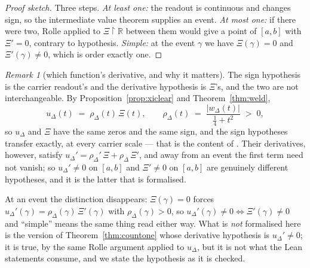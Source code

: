 \documentclass[11pt]{article}
\theoremstyle{plain}
\theoremstyle{definition}
\theoremstyle{remark}
\newtheorem{remark}[theorem]{Remark}
\newcommand{\R}{\mathbb{R}}
\newcommand{\lean}[1]{\texttt{\detokenize{#1}}}
\begin{document}
\begin{proof}[Proof sketch]
Three steps. \emph{At least one:} the readout is continuous and changes sign, so the
intermediate value theorem supplies an event. \emph{At most one:} if there were two,
Rolle applied to $\Xi\restriction\R$ between them would give a point of $[a,b]$ with
$\Xi'=0$, contrary to hypothesis. \emph{Simple:} at the event $\gamma$ we have
$\Xi(\gamma)=0$ and $\Xi'(\gamma)\ne0$, which is order exactly one.
\end{proof}

\begin{remark}[which function's derivative, and why it matters]\label{rem:whichderiv}
The sign hypothesis is the carrier readout's and the derivative hypothesis is
$\Xi$'s, and the two are not interchangeable. By
Proposition~\ref{prop:xiclear} and Theorem~\ref{thm:weld},
\[
  u_\Delta(t)\;=\;\rho_\Delta(t)\,\Xi(t),\qquad
  \rho_\Delta(t)\;=\;\frac{\lvert w_\Delta(t)\rvert}{\tfrac14+t^{2}}\;>\;0 ,
\]
so $u_\Delta$ and $\Xi$ have the same zeros and the same sign, and the sign
hypotheses transfer exactly, at every carrier scale --- that is the content of
\lean{sign_product_iff}. Their derivatives, however, satisfy
$u_\Delta'=\rho_\Delta'\,\Xi+\rho_\Delta\,\Xi'$, and away from an event the first
term need not vanish; so $u_\Delta'\ne0$ on $[a,b]$ and $\Xi'\ne0$ on $[a,b]$ are
genuinely different hypotheses, and it is the latter that is formalised.

At an event the distinction disappears: $\Xi(\gamma)=0$ forces
$u_\Delta'(\gamma)=\rho_\Delta(\gamma)\,\Xi'(\gamma)$ with $\rho_\Delta(\gamma)>0$, so
$u_\Delta'(\gamma)\ne0\iff\Xi'(\gamma)\ne0$ and ``simple'' means the same thing read
either way. What is \emph{not} formalised here is the version of
Theorem~\ref{thm:countone} whose derivative hypothesis is $u_\Delta'\ne0$; it is true,
by the same Rolle argument applied to $u_\Delta$, but it is not what the Lean
statements consume, and we state the hypothesis as it is checked.
\end{remark}
\end{document}
